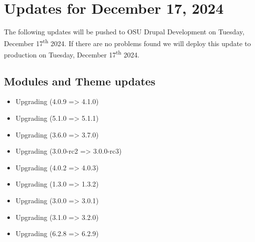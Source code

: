\section{Updates for December 17, 2024}
The following updates will be pushed to OSU Drupal Development on Tuesday, December 17\textsuperscript{th} 2024.
If there are no problems found we will deploy this update to production on Tuesday, December 17\textsuperscript{th} 2024.

\subsection{Modules and Theme updates}

\begin{itemize}
    \item Upgrading  (4.0.9 => 4.1.0)
    \item Upgrading  (5.1.0 => 5.1.1)
    \item Upgrading  (3.6.0 => 3.7.0)
    \item Upgrading  (3.0.0-rc2 => 3.0.0-rc3)
    \item Upgrading  (4.0.2 => 4.0.3)
    \item Upgrading  (1.3.0 => 1.3.2)
    \item Upgrading  (3.0.0 => 3.0.1)
    \item Upgrading  (3.1.0 => 3.2.0)
    \item Upgrading  (6.2.8 => 6.2.9)
\end{itemize}
